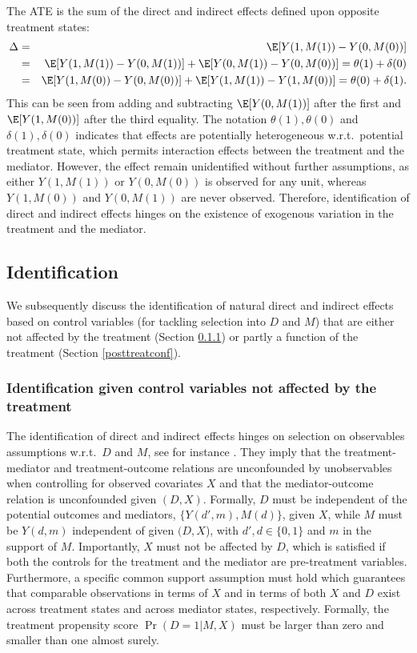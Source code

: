 \documentclass[nojss]{jss}
\begin{document}
The ATE is the sum of the direct and indirect effects defined upon opposite treatment states:
\begin{eqnarray}\label{ate}
\Delta&=&\E[Y(1,M(1))-Y(0,M(0))] \notag \\
&=&\E[Y(1,M(1))-Y(0,M(1))]+ \E[Y(0,M(1))-Y(0,M(0))] = \theta(1) + \delta(0) \notag \\
&=&\E[Y(1,M(0))-Y(0,M(0))]+ \E[Y(1,M(1))-Y(1,M(0))]=\theta(0) + \delta(1).
\end{eqnarray}
This can be seen from adding and subtracting $\E[Y(0,M(1))]$ after the first and $\E[Y(1,M(0))]$ after the third equality. The notation $\theta(1),\theta(0)$ and $\delta(1),\delta(0)$ indicates that effects are potentially heterogeneous w.r.t.\ potential treatment state, which permits interaction effects between the treatment and the mediator. However, the effect remain unidentified without further assumptions, as either $Y(1,M(1))$ or $Y(0,M(0))$ is observed for any unit, whereas $Y(1,M(0))$ and $Y(0,M(1))$ are never observed. Therefore, identification of direct and indirect effects hinges on the existence of exogenous variation in the treatment and the mediator.

\subsection{Identification}\label{id1}

We subsequently discuss the identification of natural direct and indirect effects based on control variables (for tackling selection into $D$ and $M$) that are either not affected by the treatment (Section \ref{pretreatconf}) or partly a function of the treatment (Section \ref{posttreatconf}).

\subsubsection{Identification given control variables not affected by the treatment}\label{pretreatconf}

The identification of direct and indirect effects hinges on selection on observables assumptions w.r.t.\ $D$ and $M$, see for instance \citet{ImKeYa10}. They imply that the treatment-mediator and treatment-outcome relations are unconfounded by unobservables when controlling for observed covariates $X$ and that the mediator-outcome relation is unconfounded given $(D,X)$. Formally, $D$ must be independent of the potential outcomes and mediators, $\{Y(d',m), M(d)\}$,  given $X$, while $M$ must be $Y(d,m)$ independent of   given $(D,X$), with $d',d \in \{0,1\}$ and $m$ in the support of $M$. Importantly, $X$ must not be affected by $D$, which is satisfied if both the controls for the treatment and the mediator are pre-treatment variables. Furthermore, a specific common support assumption must hold which guarantees that comparable observations in terms of $X$ and in terms of both $X$ and $D$ exist across treatment states and across mediator states, respectively. Formally, the treatment propensity score $\Pr(D=1| M, X)$ must be larger than zero and smaller than one almost surely.
\end{document}
